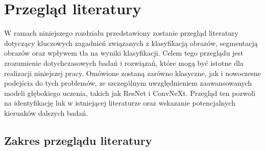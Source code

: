 \chapter*{Przegląd literatury}

W ramach niniejszego rozdziału przedstawiony zostanie przegląd literatury dotyczący 
kluczowych zagadnień związanych z klasyfikacją obrazów, segmentacją obrazów oraz wpływem 
tła na wyniki klasyfikacji. Celem tego przeglądu jest zrozumienie dotychczasowych badań i rozwiązań, 
które mogą być istotne dla realizacji niniejszej pracy. Omówione zostaną zarówno klasyczne, jak i 
nowoczesne podejścia do tych problemów, ze szczególnym uwzględnieniem zaawansowanych modeli głębokiego 
uczenia, takich jak ResNet i ConvNeXt. Przegląd ten pozwoli na identyfikację luk w istniejącej 
literaturze oraz wskazanie potencjalnych kierunków dalszych badań.

\section*{Zakres przeglądu literatury}

